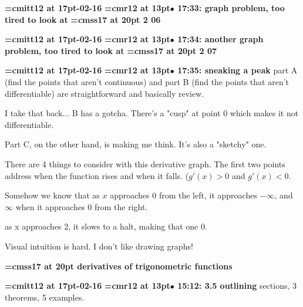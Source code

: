 {\medskip\noindent\bf\font\titlefont=cmitt12 at 17pt-02-16}\medskip
{\smallskip\noindent\bf\font\titlefont=cmr12 at 13pt\titlefont $\bullet$ 17:33: graph problem, too tired to look at}\smallskip
{}
{\medskip\noindent\bf\font\titlefont=cmss17 at 20pt 2 06}\medskip

{\medskip\noindent\bf\font\titlefont=cmitt12 at 17pt-02-16}\medskip
{\smallskip\noindent\bf\font\titlefont=cmr12 at 13pt\titlefont $\bullet$ 17:34: another graph problem, too tired to look at}\smallskip
{}
{\medskip\noindent\bf\font\titlefont=cmss17 at 20pt 2 07}\medskip

{\medskip\noindent\bf\font\titlefont=cmitt12 at 17pt-02-16}\medskip
{\smallskip\noindent\bf\font\titlefont=cmr12 at 13pt\titlefont $\bullet$ 17:35: sneaking a peak}\smallskip
part A (find the points that aren't continuous) and part B (find the points that aren't differentiable) are straightforward and basically review.
\par

I take that back... B has a gotcha. There's a "cusp" at point 0 which makes it not differentiable.
\par

Part C, on the other hand, is making me think. It's also a "sketchy" one.
\par

There are 4 things to consider with this derivative graph. The first two points address when the function rises and when it falls. ($g'(x) > 0$ and $g'(x) < 0$.
\par

Somehow we know that as $x$ approaches $0$ from the left, it approaches $-\infty$, and $\infty$ when it approaches 0 from the right.
\par

as x approaches 2, it slows to a halt, making that one 0.
\par

Visual intuition is hard. I don't like drawing graphs!
\par

{\medskip\noindent\bf\font\titlefont=cmss17 at 20pt derivatives of trigonometric functions}\medskip

{\medskip\noindent\bf\font\titlefont=cmitt12 at 17pt-02-16}\medskip
{\smallskip\noindent\bf\font\titlefont=cmr12 at 13pt\titlefont $\bullet$ 15:12: 3.5 outlining} sections, 3 theorems, 5 examples.
\par

